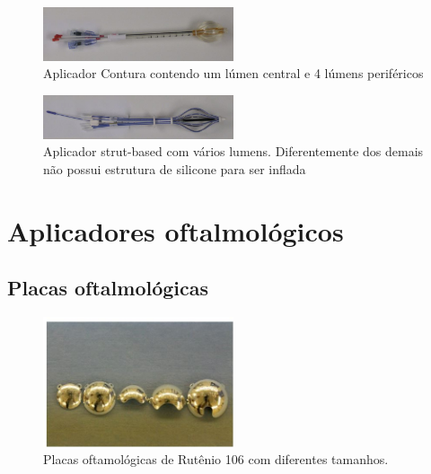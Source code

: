 \documentclass[11pt,a4paper]{article}
\begin{document}
            \begin{figure}[h]
                \centering
                \includegraphics[width=0.5\textwidth]{Imagens/aplicadorContura2.JPG}
                \caption{Aplicador Contura contendo um lúmen central e 4 lúmens periféricos}
            \end{figure}

            \begin{figure}[h]
                \centering
                \includegraphics[width=0.5\textwidth]{Imagens/aplicadorSavi.JPG}
                \caption{Aplicador strut-based com vários lumens. Diferentemente dos demais não possui estrutura de silicone para ser inflada}
            \end{figure}


    \pagebreak
    \section{Aplicadores oftalmológicos}
            
        \subsection{Placas oftalmológicas}
            
            \begin{figure}[h]
                \centering
                \includegraphics[width=0.5\textwidth]{Imagens/aplicadorPlacasOftamicasDeRutenio103.JPG}
                \caption{Placas oftamológicas de Rutênio 106 com diferentes tamanhos.}
            \end{figure}
\end{document}
